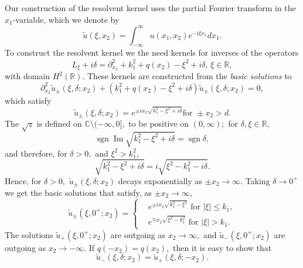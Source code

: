 \documentclass[11pt]{article}
\newcommand\tu{\widetilde u}
\renewcommand\Im{\operatorname{Im}}
\newcommand\bbC{\mathbb C}
\newcommand\bbR{\mathbb R}
\newcommand\pa{\partial}
\newcommand\Sgn{\operatorname{sgn}}
\theoremstyle{definition}
\theoremstyle{remark}
\begin{document}
Our construction of the resolvent kernel uses the partial Fourier transform in
the $x_1$-variable, which we denote by
\begin{equation}
  \tu(\xi,x_2)=\int_{-\infty}^{\infty}u(x_1,x_2)e^{-i\xi x_1}dx_1.
\end{equation}
 To construct the resolvent kernel we  the need
 kernels for inverses of the operators
 $$L_{\xi}+i\delta=
 \pa^2_{x_2}+k_1^2+q(x_2)-\xi^2+i\delta,\,\xi\in\bbR,$$
 with domain $H^2(\bbR).$ 
 These kernels are constructed from the \emph{basic solutions} to
\begin{equation}\label{eqn209.81}
  \pa^2_{x_2}\tu_{\pm}(\xi,\delta;x_2)+(k_1^2+q(x_2)-\xi^2+i\delta)
  \tu_{\pm}(\xi,\delta;x_2)=0,
\end{equation}
which satisfy
\begin{equation}\label{eqn7}
  \tu_{\pm}(\xi,\delta;x_2)=e^{\pm ix_2\sqrt{k^2_1-\xi^2+i\delta}}\text{
    for }\pm x_2>d.
\end{equation}
The  $\sqrt{z}$ is defined on $\bbC\setminus (-\infty,0],$ to be positive
on $(0,\infty);$  for $\delta,\xi\in\bbR,$ 
$$\Sgn\Im\sqrt{k_1^2-\xi^2+i\delta}=\Sgn\delta,$$
and therefore, for $\delta>0,$ and $\xi^2>k_1^2,$
\begin{equation}\label{eqn176.55}
  \sqrt{k_1^2-\xi^2+i\delta}=i\sqrt{\xi^2-k_1^2-i\delta}.
\end{equation}
Hence, for $\delta>0,$   $\tu_{\pm}(\xi,\delta;x_2)$ decays
exponentially as $\pm x_2\to\infty.$ 
Taking $\delta\to 0^+$ we get the basic solutions that
satisfy, as $\pm x_2\to\infty,$
\begin{equation}
  \tu_{\pm}(\xi,0^+;x_2)=\begin{cases} &e^{\pm i
    x_2\sqrt{k_1^2-\xi^2}}\text{ for }|\xi|\leq k_1,\\
  &e^{\mp
    x_2\sqrt{\xi^2-k_1^2}}\text{ for }|\xi|> k_1.
  \end{cases}
\end{equation}
The solutions $\tu_+(\xi,0^+;x_2)$ are outgoing as $x_2\to\infty,$ and
$\tu_-(\xi,0^+;x_2)$ are outgoing as $x_2\to-\infty.$  If $q(-x_2)=q(x_2),$ then it
is easy to show that 
\begin{equation}\label{eqn8}
  \tu_{-}(\xi,\delta;x_2)=\tu_{+}(\xi,\delta;-x_2).
\end{equation}
\end{document}
